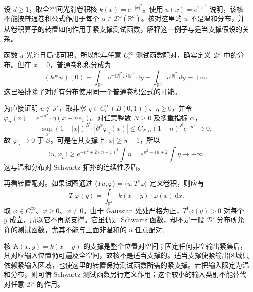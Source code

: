 \begin{exercise}\label{b2:ex:app-G-8}
设 \(d\ge1\)，取全空间光滑卷积核 \(k(x)=e^{-|x|^2}\)。使用
\(u(x)=e^{2|x|^2}\) 说明，该核不能按普通卷积公式作用于每个
\(u\in\mathcal D'(\mathbb R^d)\)。核对这里的 \(u\) 不是温和分布，并从卷积算子的转置如何作用于紧支撑测试函数，解释这一例子与适当支撑假设的关系。
\end{exercise}
\begin{solution}
函数 \(u\) 光滑且局部可积，所以能与任意 \(C_c^\infty\) 测试函数配对，确实定义 \(\mathcal D'\) 中的分布。但在 \(x=0\)，普通卷积积分成为
\[
 (k*u)(0)=\int_{\mathbb R^d}e^{-|y|^2}e^{2|y|^2}\,\mathrm dy
         =\int_{\mathbb R^d}e^{|y|^2}\,\mathrm dy=+\infty.
\]
这已经排除了对所有分布使用同一个普通卷积公式的可能。

为直接证明 \(u\notin\mathcal S'\)，取非零 \(\eta\in C_c^\infty(B(0,1))\)、\(\eta\ge0\)，并令
\(\varphi_n(x)=e^{-n^2}\cdot\eta(x-ne_1)\)。对任意整数 \(N\ge0\) 及多重指标 \(\alpha\)，
\[
 \sup_x(1+|x|)^N\cdot|\partial^\alpha\varphi_n(x)|
 \le C_{N,\alpha}(1+n)^Ne^{-n^2}\longrightarrow0,
\]
故 \(\varphi_n\to0\) 于 \(\mathcal S\)。可是在其支撑上 \(|x|\ge n-1\)，所以
\[
 \langle u,\varphi_n\rangle
 \ge e^{-n^2+2(n-1)^2}\int\eta
 =e^{n^2-4n+2}\int\eta\longrightarrow+\infty.
\]
这与温和分布对 Schwartz 拓扑的连续性矛盾。

再看转置配对。如果试图通过
\(\langle Tu,\varphi\rangle=\langle u,T^{\mathrm t}\varphi\rangle\)
定义卷积，则应有
\[
 T^{\mathrm t}\varphi(y)
 =\int_{\mathbb R^d}k(x-y)\cdot\varphi(x)\,\mathrm dx.
\]
取 \(\varphi\in C_c^\infty\)、\(\varphi\ge0\)、\(\varphi\ne0\)。由于 Gaussian 处处严格为正，\(T^{\mathrm t}\varphi(y)>0\) 对每个 \(y\) 成立，所以它不再紧支撑。它虽仍是 Schwartz 函数，却不是一般 \(\mathcal D'\) 分布所允许的测试函数，尤其不能与上面非温和的 \(u\) 任意配对。

核 \(K(x,y)=k(x-y)\) 的支撑是整个位置对空间；固定任何非空输出紧集后，其对应输入位置仍可遍及全空间，故核不是适当支撑的。适当支撑使紧输出区域只依赖紧输入区域，也使这里的转置保持测试函数所需的紧支撑。若把输入限定为温和分布，则可借 Schwartz 测试函数另行定义作用；这个较小的输入类别不能替代对任意 \(\mathcal D'\) 的作用。
\end{solution}
